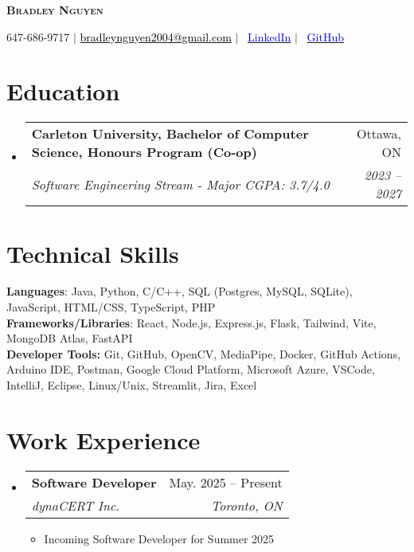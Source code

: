 \documentclass[letterpaper,11pt]{article}
\makeatletter
\newcommand{\resumeItem}[1]{
  \item\small{
    {#1 \vspace{-2pt}}
  }
}
\newcommand{\resumeSubheading}[4]{
  \vspace{-2pt}\item
    \begin{tabular*}{0.97\textwidth}[t]{l@{\extracolsep{\fill}}r}
      \textbf{#1} & #2 \\
      \textit{\small#3} & \textit{\small #4} \\
    \end{tabular*}\vspace{-7pt}
}
\newcommand{\resumeSubHeadingListStart}{\begin{itemize}[leftmargin=0.15in, label={}]}
\newcommand{\resumeSubHeadingListEnd}{\end{itemize}}
\newcommand{\resumeItemListStart}{\begin{itemize}}
\newcommand{\resumeItemListEnd}{\end{itemize}\vspace{-5pt}}
\makeatother
\begin{document}

\begin{center}
    \textbf{\Huge \scshape Bradley Nguyen} \\ \vspace{1pt}

    \small 647-686-9717 $|$ \href{mailto:bradleynguyen2004@gmail.com}{\textcolor{black}{bradleynguyen2004@gmail.com}} $|$ 
    \faLinkedin\ \href{https://linkedin.com/in/bradley-nguyen-cs}{\textcolor{blue}{LinkedIn}} $|$
    \faGithub\ \href{https://github.com/bradleyngu}{\textcolor{blue}{GitHub}}
\end{center}


\section{Education}
  \resumeSubHeadingListStart
    \resumeSubheading
      {Carleton University, Bachelor of Computer Science, Honours Program (Co-op)}{Ottawa, ON}
      {Software Engineering Stream - Major CGPA: 3.7/4.0}{2023 -- 2027}
  \resumeSubHeadingListEnd

\section{Technical Skills}
 \begin{itemize}[leftmargin=0.15in, label={}]
    \small{\item{
     \textbf{Languages}{: Java, Python, C/C++, SQL (Postgres, MySQL, SQLite), JavaScript, HTML/CSS, TypeScript, PHP} \\
     \textbf{Frameworks/Libraries}{: React, Node.js, Express.js, Flask, Tailwind, Vite, MongoDB Atlas, FastAPI} \\
     \textbf{Developer Tools:} Git, GitHub, OpenCV, MediaPipe, Docker, GitHub Actions, Arduino IDE, Postman, Google Cloud Platform, Microsoft Azure, VSCode, IntelliJ, Eclipse, Linux/Unix, Streamlit, Jira, Excel
    }}
 \end{itemize}

\section{Work Experience}
  \resumeSubHeadingListStart
    \resumeSubheading
      {Software Developer}{May. 2025 -- Present}
      {dynaCERT Inc.}{Toronto, ON}
      \resumeItemListStart
        \resumeItem{Incoming Software Developer for Summer 2025}
      \resumeItemListEnd
  \resumeSubHeadingListEnd
\end{document}
